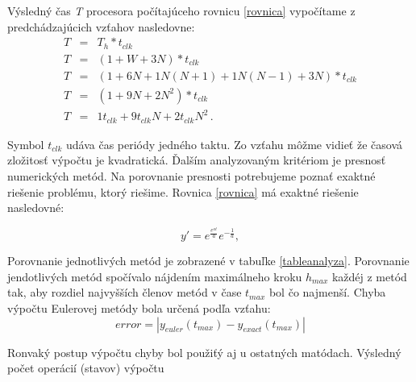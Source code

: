 Výsledný čas \textit{T} procesora počítajúceho rovnicu \ref{rovnica} vypočítame z predchádzajúcich vzťahov nasledovne:
\begin{eqnarray}
T & = & T_h * t_{clk} \nonumber \\
T & = & (1 + W + 3N)*t_{clk} \nonumber \\ 
T & = & (1 + 6N + 1N(N+1) + 1N(N-1) + 3N)*t_{clk} \nonumber \\
T & = & (1 + 9N + 2N^2)*t_{clk} \nonumber \\
T & = & 1t_{clk} + 9t_{clk}N + 2t_{clk}N^2 \, .
\end{eqnarray}

Symbol $ t_{clk} $ udáva čas periódy jedného taktu. Zo vzťahu môžme vidieť že časová zložitosť výpočtu je kvadratická.
Ďalším analyzovaným kritériom je presnosť numerických metód. Na porovnanie presnosti potrebujeme poznať exaktné riešenie problému, ktorý riešime. Rovnica \ref{rovnica} má exaktné riešenie nasledovné:

\begin{equation}
y' = e^{\frac{e^{at}}{a}} e^{-\frac{1}{a}} ,
\end{equation}
\bigskip


Porovnanie jednotlivých metód je zobrazené v tabuľke \ref{tableanalyza}. Porovnanie jendotlivých metód spočívalo nájdením maximálneho kroku $ h_{max} $ každéj z metód tak, aby rozdiel najvyšších členov metód v čase $ t_{max} $ bol čo najmenší. Chyba výpočtu Eulerovej metódy bola určená podľa vzťahu:
\begin{equation}
error = |y_{euler}(t_{max}) - y_{exact}(t_{max})|
\end{equation}
\bigskip

Ronvaký postup výpočtu chyby bol použiťý aj u ostatných matódach. Výsledný počet operácií (stavov) výpočtu 





